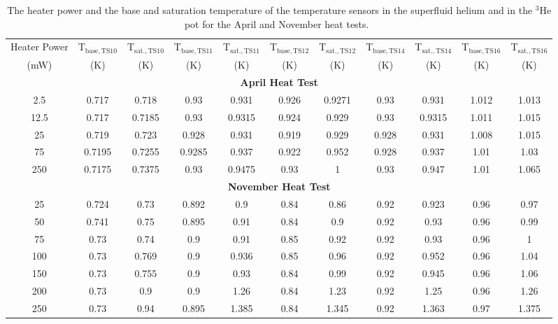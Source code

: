 \begin{table}
  \begin{tabular}{|c|c|c|c|c|c|c|c|c|c|c|}
    \hline
    Heater Power & T$_{\mathrm{base, TS10}}$ &  T$_{\mathrm{sat., TS10}}$ & T$_{\mathrm{base, TS11}}$ &  T$_{\mathrm{sat., TS11}}$ & T$_{\mathrm{base, TS12}}$ &  T$_{\mathrm{sat., TS12}}$ & T$_{\mathrm{base, TS14}}$ &  T$_{\mathrm{sat., TS14}}$ & T$_{\mathrm{base, TS16}}$ &  T$_{\mathrm{sat., TS16}}$ \\
    (mW) & (K) & (K) & (K) & (K) & (K) & (K) & (K) & (K) & (K) & (K) \\
    \hline
    \hline
    \multicolumn{11}{|c|}{\textbf{April Heat Test}}\\
    \hline
   2.5 & 0.717 & 0.718 & 0.93 & 0.931 & 0.926 & 0.9271 & 0.93 & 0.931 & 1.012 & 1.013 \\
    \hline
    12.5 & 0.717 & 0.7185 & 0.93 &  0.9315 & 0.924 & 0.929 & 0.93 & 0.9315 & 1.011 & 1.015 \\
    \hline
    25 & 0.719 & 0.723 & 0.928 & 0.931 & 0.919 & 0.929 & 0.928 & 0.931 & 1.008 & 1.015 \\
    \hline
    75 & 0.7195 & 0.7255 & 0.9285 & 0.937 & 0.922 & 0.952 & 0.928 & 0.937 & 1.01 & 1.03 \\
    \hline
    250 & 0.7175 & 0.7375 & 0.93 & 0.9475 & 0.93 & 1 & 0.93 & 0.947 & 1.01 & 1.065 \\
    \hline
    \multicolumn{11}{|c|}{\textbf{November Heat Test}}\\
    \hline
   25 & 0.724 & 0.73 & 0.892 & 0.9 & 0.84 & 0.86 & 0.92 & 0.923 & 0.96 & 0.97 \\
    \hline
    50 & 0.741 & 0.75 & 0.895 & 0.91 & 0.84 & 0.9 & 0.92 & 0.93 & 0.96 & 0.99 \\
    \hline
    75 & 0.73 & 0.74 & 0.9 & 0.91 & 0.85 & 0.92 & 0.92 & 0.93 & 0.96 & 1 \\
    \hline
    100 & 0.73 & 0.769 & 0.9 & 0.936 & 0.85 & 0.96 & 0.92 & 0.952 & 0.96 & 1.04 \\
    \hline
    150 & 0.73 & 0.755 & 0.9 & 0.93 & 0.84 & 0.99 & 0.92 & 0.945 & 0.96 & 1.06 \\
    \hline
    200 & 0.73 & 0.9 & 0.9 & 1.26 & 0.84 & 1.23 & 0.92 & 1.25 & 0.96 & 1.26 \\
    \hline
    250 & 0.73 & 0.94 & 0.895 & 1.385 & 0.84 & 1.345 & 0.92 & 1.363 & 0.97 & 1.375 \\
    \hline
  \end{tabular}
  \caption{The heater power and the base and saturation temperature of the 
    temperature sensors in the superfluid helium and in the $^3$He pot for
    the April and November heat tests.~\cite{Florian_thesis}}
  \label{tab:heattest}
\end{table}


